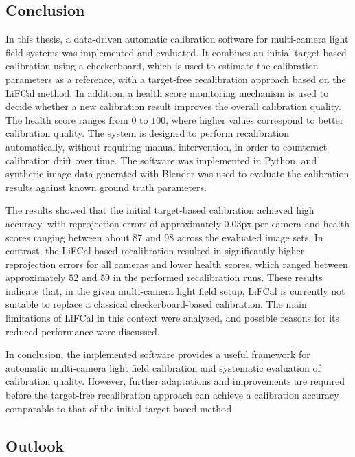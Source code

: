 \documentclass[12pt]{scrartcl}
\begin{document}
\subsection{Conclusion}

In this thesis, a data-driven automatic calibration software for multi-camera light field systems was implemented and evaluated. It combines an initial target-based calibration using a checkerboard, which is used to estimate the calibration parameters as a reference, with a target-free recalibration approach based on the LiFCal method. In addition, a health score monitoring mechanism is used to decide whether a new calibration result improves the overall calibration quality. The health score ranges from $0$ to $100$, where higher values correspond to better calibration quality. The system is designed to perform recalibration automatically, without requiring manual intervention, in order to counteract calibration drift over time. The software was implemented in Python, and synthetic image data generated with Blender was used to evaluate the calibration results against known ground truth parameters.
\newline

The results showed that the initial target-based calibration achieved high accuracy, with reprojection errors of approximately $0.03$px per camera and health scores ranging between about $87$ and $98$ across the evaluated image sets. In contrast, the LiFCal-based recalibration resulted in significantly higher reprojection errors for all cameras and lower health scores, which ranged between approximately $52$ and $59$ in the performed recalibration runs. These results indicate that, in the given multi-camera light field setup, LiFCal is currently not suitable to replace a classical checkerboard-based calibration. The main limitations of LiFCal in this context were analyzed, and possible reasons for its reduced performance were discussed.
\newline

In conclusion, the implemented software provides a useful framework for automatic multi-camera light field calibration and systematic evaluation of calibration quality. However, further adaptations and improvements are required before the target-free recalibration approach can achieve a calibration accuracy comparable to that of the initial target-based method.

\subsection{Outlook}
\end{document}
